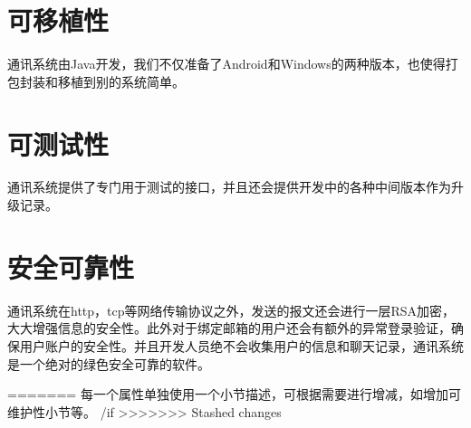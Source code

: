 \section{可移植性}
通讯系统由Java开发，我们不仅准备了Android和Windows的两种版本，也使得打包封装和移植到别的系统简单。

\section{可测试性}
通讯系统提供了专门用于测试的接口，并且还会提供开发中的各种中间版本作为升级记录。

\section{安全可靠性}
通讯系统在http，tcp等网络传输协议之外，发送的报文还会进行一层RSA加密，大大增强信息的安全性。此外对于绑定邮箱的用户还会有额外的异常登录验证，确保用户账户的安全性。并且开发人员绝不会收集用户的信息和聊天记录，通讯系统是一个绝对的绿色安全可靠的软件。

=======
每一个属性单独使用一个小节描述，可根据需要进行增减，如增加可维护性小节等。
/if
>>>>>>> Stashed changes
